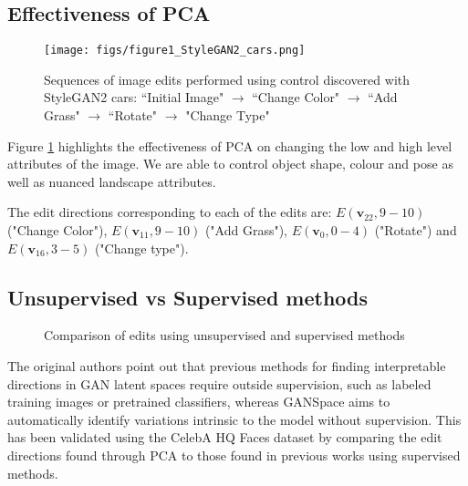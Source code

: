 \subsection{Effectiveness of PCA}

\begin{figure}[H]
    \centering
    \texttt{[image: figs/figure1\_StyleGAN2\_cars.png]}
    \caption{Sequences of image edits performed using control discovered with StyleGAN2 cars: ``Initial Image" $\rightarrow$ ``Change Color" $\rightarrow$ ``Add Grass" $\rightarrow$ ``Rotate" $\rightarrow$ "Change Type"}
    \label{fig:cars}
\end{figure}

Figure \ref{fig:cars} highlights the effectiveness of PCA on changing the low and high level attributes of the image. We are able to control object shape, colour and pose as well as nuanced landscape attributes.

The edit directions corresponding to each of the edits are: $E(\textbf{v}_{22}, 9-10)$ ("Change Color"), $E(\textbf{v}_{11}, 9-10)$ ("Add Grass"), $E(\textbf{v}_{0}, 0-4)$ ("Rotate") and $E(\textbf{v}_{16}, 3-5)$ ("Change type").

\subsection{Unsupervised vs Supervised methods}

\begin{figure}[H]



\caption{Comparison of edits using unsupervised and supervised methods}

\end{figure}

The original authors point out that previous methods for finding interpretable directions in GAN latent spaces require outside supervision, such as labeled training images or pretrained classifiers, whereas GANSpace aims to automatically identify variations intrinsic to the model without supervision. This has been validated using the CelebA HQ Faces dataset by comparing the edit directions found through PCA to those found in previous works using supervised methods.

